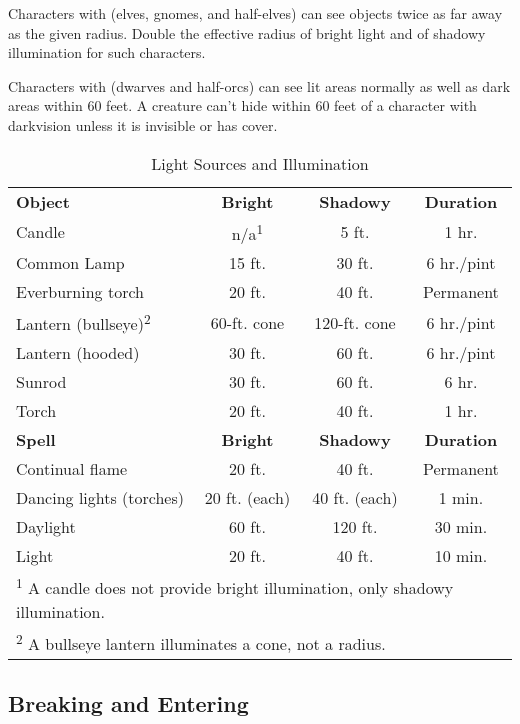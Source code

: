 Characters with  (elves, gnomes, and half-elves) can see objects 
twice as far away as the given radius. Double the effective radius of bright light 
and of shadowy illumination for such characters.

Characters with  (dwarves and half-orcs) can see lit areas normally as 
well as dark areas within 60 feet. A creature can't hide within 60 feet of a character 
with darkvision unless it is invisible or has cover.

\begin{table}[htb]
\caption{Light Sources and Illumination}
\centering
\begin{tabular}{l c c c}
\textbf{Object} & \textbf{Bright} & \textbf{Shadowy} & \textbf{Duration}\\
Candle & n/a\textsuperscript{1} & 5 ft. & 1 hr.\\
Common Lamp & 15 ft. & 30 ft. & 6 hr./pint\\
Everburning torch & 20 ft. & 40 ft. & Permanent\\
Lantern (bullseye)\textsuperscript{2} & 60-ft. cone & 120-ft. cone & 6 hr./pint\\
Lantern (hooded) & 30 ft. & 60 ft. & 6 hr./pint\\
Sunrod & 30 ft. & 60 ft. & 6 hr.\\
Torch & 20 ft. & 40 ft. & 1 hr.\\
\textbf{Spell} & \textbf{Bright} & \textbf{Shadowy} & \textbf{Duration}\\
Continual flame & 20 ft. & 40 ft. & Permanent\\
Dancing lights (torches) & 20 ft. (each) & 40 ft. (each) & 1 min.\\
Daylight & 60 ft. & 120 ft. & 30 min.\\
Light & 20 ft. & 40 ft. & 10 min.\\
\multicolumn{4}{l}{\textsuperscript{1} A candle does not provide bright illumination, only shadowy illumination.}\\
\multicolumn{4}{l}{\textsuperscript{2} A bullseye lantern illuminates a cone, not a radius.}\\
\end{tabular}
\end{table}

\subsection{Breaking and Entering}

